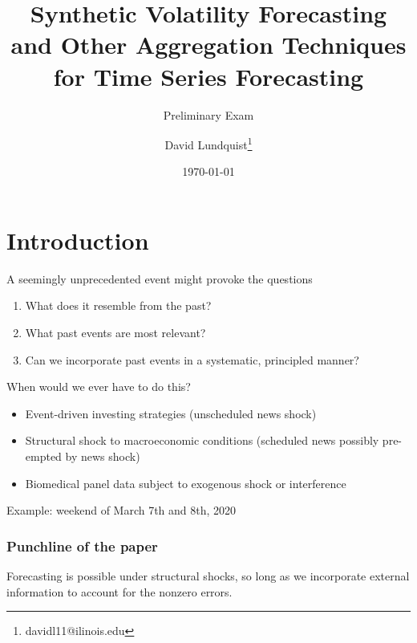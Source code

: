 \documentclass[pdf]{beamer}
\title{Synthetic Volatility Forecasting and Other Aggregation Techniques for Time Series Forecasting}
\subtitle{Preliminary Exam}
\author{David Lundquist\thanks{davidl11@ilinois.edu}}
\date{\today}
\begin{document}
\begin{frame}
\titlepage
\end{frame}

\section{Introduction}

\begin{frame}
A seemingly unprecedented event might provoke the questions

\begin{enumerate}
    \item What does it resemble from the past?
    \item What past events are most relevant?
    \item Can we incorporate past events in a systematic, principled manner? 
\end{enumerate}

\end{frame}
\begin{frame}
When would we ever have to do this?
    \begin{itemize}
        \item Event-driven investing strategies (unscheduled news shock) 
        \item Structural shock to macroeconomic conditions (scheduled news possibly pre-empted by news shock)
        \item Biomedical panel data subject to exogenous shock or interference
    \end{itemize}

Example: weekend of March 7th and 8th, 2020

\end{frame}

\begin{frame}
\frametitle{Punchline of the paper}

Forecasting is possible under structural shocks, so long as we incorporate external information to account for the nonzero errors.

\end{frame}
\end{document}
